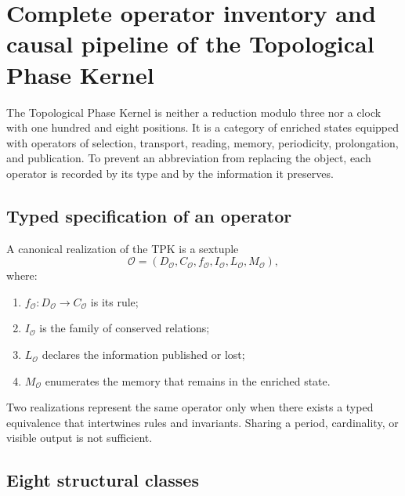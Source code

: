 
\chapter{Complete operator inventory and causal pipeline of the Topological Phase Kernel}
\label{chap:inventario-operatorio-completo-tpk}

The Topological Phase Kernel is neither a reduction modulo three nor a clock with one hundred and eight positions. It is a category of enriched states equipped with operators of selection, transport, reading, memory, periodicity, prolongation, and publication. To prevent an abbreviation from replacing the object, each operator is recorded by its type and by the information it preserves.

\section{Typed specification of an operator}

\begin{definition}
\label{def:u006f-ficha-operatoria}
A canonical realization of the TPK is a sextuple
\begin{equation}
 \mathcal O=
 (D_{\mathcal O},C_{\mathcal O},f_{\mathcal O},
 I_{\mathcal O},L_{\mathcal O},M_{\mathcal O}),
 \label{eq:u006f-ficha}
\end{equation}
where:
\begin{enumerate}
 \item \(f_{\mathcal O}:D_{\mathcal O}\to C_{\mathcal O}\) is its rule;
 \item \(I_{\mathcal O}\) is the family of conserved relations;
 \item \(L_{\mathcal O}\) declares the information published or lost;
 \item \(M_{\mathcal O}\) enumerates the memory that remains in the enriched
 state.
\end{enumerate}
\end{definition}

Two realizations represent the same operator only when there exists a
typed equivalence that intertwines rules and invariants. Sharing a period,
cardinality, or visible output is not sufficient.

\section{Eight structural classes}

